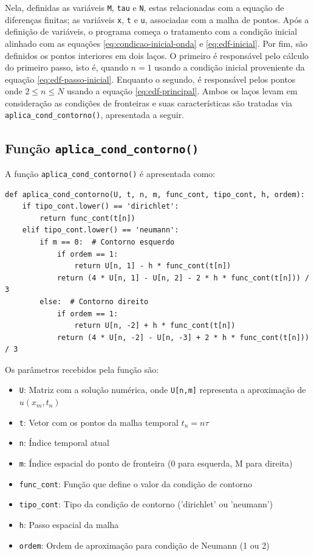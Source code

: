 \documentclass[column,amsmath,amssymb,floatfix]{revtex4}
\begin{document}
Nela, definidas as variáveis \texttt{M}, \texttt{tau} e \texttt{N}, estas relacionadas com a equação de diferenças finitas; as variáveis \texttt{x}, \texttt{t} e \texttt{u}, associadas com a malha de pontos. Após a definição de variáveis, o programa começa o tratamento com a condição inicial alinhado com as equações \eqref{eq:condicao-inicial-onda} e \eqref{eq:edf-inicial}. Por fim, são definidos os pontos interiores em dois laços. O primeiro é responsável pelo cálculo do primeiro passo, isto é, quando $n=1$ usando a condição inicial proveniente da equação \eqref{eq:edf-passo-inicial}. Enquanto o segundo, é responsável pelos pontos onde $2 \leq n \leq N$ usando a equação \eqref{eq:edf-principal}. Ambos os laços levam em consideração as condições de fronteiras e suas características são tratadas via \texttt{aplica\_cond\_contorno()}, apresentada a seguir.

\subsection{Função \texttt{aplica\_cond\_contorno()}}
A função \texttt{aplica\_cond\_contorno()} é apresentada como:
\begin{lstlisting}
def aplica_cond_contorno(U, t, n, m, func_cont, tipo_cont, h, ordem):
    if tipo_cont.lower() == 'dirichlet':
        return func_cont(t[n])
    elif tipo_cont.lower() == 'neumann':
        if m == 0:  # Contorno esquerdo
            if ordem == 1:
                return U[n, 1] - h * func_cont(t[n])
            return (4 * U[n, 1] - U[n, 2] - 2 * h * func_cont(t[n])) / 3
        else:  # Contorno direito
            if ordem == 1:
                return U[n, -2] + h * func_cont(t[n])
            return (4 * U[n, -2] - U[n, -3] + 2 * h * func_cont(t[n])) / 3
\end{lstlisting}

Os parâmetros recebidos pela função são:
\begin{itemize}
	\item \texttt{U}: Matriz com a solução numérica, onde \texttt{U[n,m]} representa a aproximação de $u(x_m,t_n)$
	\item \texttt{t}: Vetor com os pontos da malha temporal $t_n = n\tau$
	\item \texttt{n}: Índice temporal atual
	\item \texttt{m}: Índice espacial do ponto de fronteira (0 para esquerda, M para direita)
	\item \texttt{func\_cont}: Função que define o valor da condição de contorno
	\item \texttt{tipo\_cont}: Tipo da condição de contorno ('dirichlet' ou 'neumann')
	\item \texttt{h}: Passo espacial da malha
	\item \texttt{ordem}: Ordem de aproximação para condição de Neumann (1 ou 2)
\end{itemize}
\end{document}
